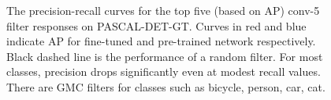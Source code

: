 
\begin{figure}[t!]
\centering
\caption{The precision-recall curves for the top five (based on AP) conv-5 filter responses on PASCAL-DET-GT. Curves in red and blue indicate AP for fine-tuned and pre-trained network respectively. Black dashed line is the performance of a random filter. For most classes, precision drops significantly even at modest recall values. There are GMC filters for classes such as bicycle, person, car, cat.}
\label{fig:ap}
\end{figure}


